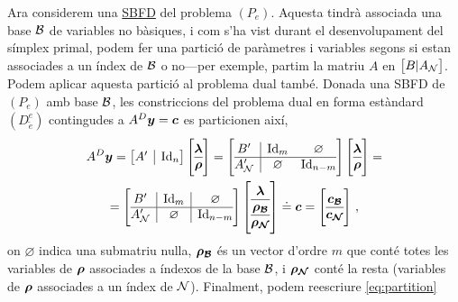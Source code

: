Ara considerem una \hyperref[defi:SBFD]{SBFD} del problema $(P_e)$. Aquesta
tindrà associada una base $\mathcal{B}$ de variables no bàsiques, i com s'ha vist durant
el desenvolupament del símplex primal, podem fer una partició de paràmetres i
variables segons si estan associades a un índex de $\mathcal{B}$ o no---per exemple,
partim la matriu $A$ en $\left[B\vert A_{\mathcal{N}}\right]$. Podem aplicar aquesta
partició al problema dual també. Donada una SBFD de $(P_e)$ amb base $\mathcal{B}$, les
constriccions del problema dual en forma estàndard $(D^e_{\tilde{e}})$
contingudes a $A^D\boldsymbol{y} = \boldsymbol{c}$ es particionen així,
\begin{multline}\label{eq:partition}
A^D\vb{y} =
\left[\begin{array}{{@{}c|c@{}}}
A' & \Id_n
\end{array}\right]
\left[\begin{array}{{@{}c@{}}}
\vb{\lambda}\\
\hline
\vb{\rho}
\end{array}\right] 
=
\left[\begin{array}{{@{}c|cc@{}}}
B'		& \Id_m 		  &	\varnothing	\\
\hline
A_\N' 	& \varnothing & \Id_{n-m}
\end{array}\right]
\left[\begin{array}{{@{}c@{}}}
\vb{\lambda}\\
\hline
\vb{\rho}
\end{array}\right] 
=\\
=
\left[\begin{array}{{@{}c|c|c@{}}}
B'		& \Id_m 		  &	\varnothing	\\
\hline
A_\N' 	& \varnothing & \Id_{n-m}
\end{array}\right]
\left[\begin{array}{{@{}c@{}}}
\vb{\lambda}\\
\hline
\vb{\rho_\B}\\
\hline
\vb{\rho_\N}
\end{array}\right]
\doteq \vb{c}
=
\left[\begin{array}{{@{}c@{}}}
\vb{c_\B}\\
\hline
\vb{c_\N}
\end{array}\right]\,,
\end{multline}
on $\varnothing$ indica una submatriu nul\lgem la, $\boldsymbol{\rho_{\mathcal{B}}}$ és un vector
d'ordre $m$ que conté totes les variables de $\boldsymbol{\rho}$ associades a índexos de
la base $\mathcal{B}$, i $\boldsymbol{\rho_{\mathcal{N}}}$ conté la resta (variables de $\boldsymbol{\rho}$
associades a un índex de $\mathcal{N}$). Finalment, podem reescriure \eqref{eq:partition}
